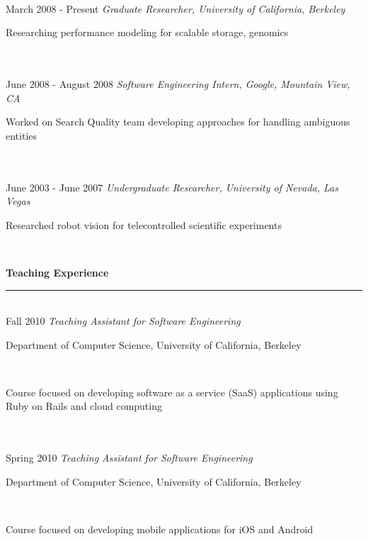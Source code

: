 \documentclass[11pt]{article}
\newcommand{\parwidth}{4.8 in}
\newcommand{\tabwidth}{2.0 in}
\newcommand{\head}[1]{
{\bf #1} \\
\rule{\textwidth}{0.01 in}

\vspace{-0.35 in}

}
\begin{document}
\begin{tabbing}
\hspace{\tabwidth} \= \\ 
March 2008 - Present \> \emph{Graduate Researcher, University of California, Berkeley} \\ 
\> \parbox[t]{\parwidth}{
Researching performance modeling for scalable storage, genomics
}\\

\hspace{\tabwidth} \= \\ 
June 2008 - August 2008 \> \emph{Software Engineering Intern, Google, Mountain View, CA} \\ 
\> \parbox[t]{\parwidth}{
Worked on Search Quality team developing approaches for handling ambiguous entities
}\\

\hspace{\tabwidth} \= \\ 
June 2003 - June 2007 \> \emph{Undergraduate Researcher, University of Nevada, Las Vegas} \\ 
\> \parbox[t]{\parwidth}{
Researched robot vision for telecontrolled scientific experiments
}\\

\end{tabbing}
\head{Teaching Experience}

\begin{tabbing}
\hspace{\tabwidth} \= \\

Fall 2010 \> \emph{Teaching Assistant for Software Engineering}\\
\> \parbox[t]{\parwidth}{Department of Computer Science, University of California, Berkeley} \\ 
\> \parbox[t]{\parwidth}{Course focused on developing software as a service (SaaS) applications using Ruby on Rails and cloud computing} \\ \\

Spring 2010 \> \emph{Teaching Assistant for Software Engineering} \\
\> \parbox[t]{\parwidth}{Department of Computer Science, University of California, Berkeley} \\ 
\> \parbox[t]{\parwidth}{Course focused on developing mobile applications for iOS and Android} \\ 

\end{tabbing}
\end{document}
